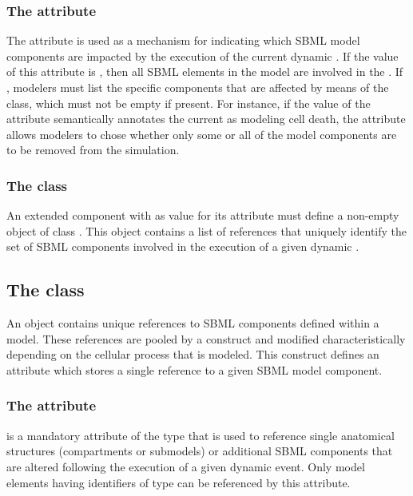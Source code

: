 \subsubsection{The  attribute}
\label{attr:applyToAll}
The  attribute is used as a mechanism for indicating which SBML model components are impacted by the execution of the current dynamic \Event. If the value of this attribute is , then all SBML elements in the model are involved in the \Event. If , modelers must list the specific components that are affected by means of the \ListOfElements class, which must not be empty if present. For instance, if the value of the  attribute semantically annotates the current \Event as modeling cell death, the  attribute allows modelers to chose whether only some or all of the model components are to be removed from the simulation. 

\subsubsection{The  class}
\label{subsec:ListOfElements}
An extended \Event component with  as value for its  attribute must define a non-empty object of class \ListOfElements. This object contains a list of \Element references that uniquely identify the set of SBML components involved in the execution of a given dynamic \Event.

\subsection{The  class}
\label{subsec:Element}
An \Element object contains unique references to SBML components defined within a model. These references are pooled by a \ListOfElements construct and modified characteristically depending on the cellular process that is modeled. This construct defines an  attribute which stores a single reference to a given SBML model component.

\subsubsection{The  attribute}
\label{attr:element}

 is a mandatory attribute of the type  that is used to reference single anatomical structures (compartments or submodels) or additional SBML components that are altered following the execution of a given dynamic event. Only model elements having identifiers of type  can be referenced by this attribute. 

